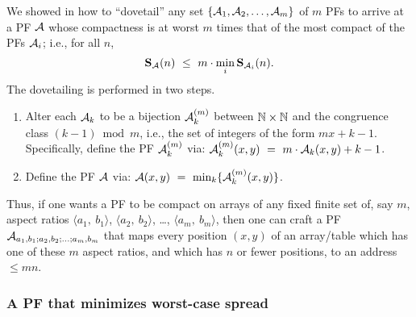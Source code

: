 We showed in \cite{Rosenberg75} how to ``dovetail'' any set $\{ \mbox{$\cal A$}_1,
\mbox{$\cal A$}_2, \ldots, \mbox{$\cal A$}_m \}$ of $m$ PFs to arrive at a PF $\mbox{$\cal A$}$ whose
compactness is at worst $m$ times that of the most compact of the PFs
$\mbox{$\cal A$}_i$; i.e., for all $n$,
\[  {\bf S}_{\cal A}(n) \ \leq \ m \cdot \min_i {\bf S}_{{\cal
	A}_i}(n). \]
The dovetailing is performed in two steps.
\begin{enumerate}
\item
Alter each $\mbox{$\cal A$}_k$ to be a bijection $\mbox{$\cal A$}^{(m)}_k$ between $\mathbb{N} \times
\mathbb{N}$ and the congruence class $(k-1) \bmod m$, i.e., the set of
integers of the form $mx + k-1$.  Specifically, define the PF
$\mbox{$\cal A$}^{(m)}_k$ via: $\mbox{$\cal A$}^{(m)}_k(x,y) \ = \ m \cdot \mbox{$\cal A$}_k(x,y) + k-1$.
\item
Define the PF $\mbox{$\cal A$}$ via:
$\mbox{$\cal A$}(x,y) \ = \ \min_k\{ \mbox{$\cal A$}^{(m)}_k(x,y) \}$.
\end{enumerate}
Thus, if one wants a PF to be compact on arrays of any fixed finite
set of, say $m$, aspect ratios $\langle a_1, \ b_1 \rangle$, $\langle
a_2, \ b_2 \rangle$, \ldots, $\langle a_m, \ b_m \rangle$, then one
can craft a PF $\mbox{$\cal A$}_{a_1,b_1; a_2,b_2; \ldots; a_m,b_m}$ that maps
every position $(x,y)$ of an array/table which has one of these $m$
aspect ratios, and which has $n$ or fewer positions, to an address
$\leq mn$.

\subsubsection{A PF that minimizes worst-case spread}

